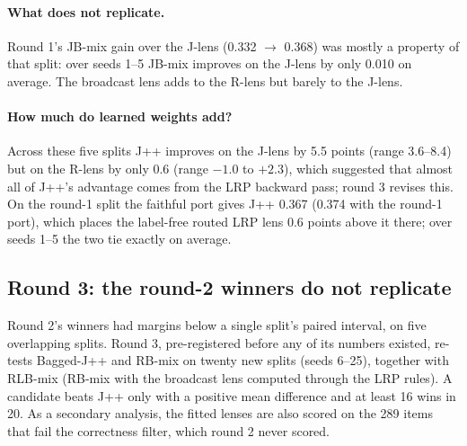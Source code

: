\documentclass[11pt]{article}
\theoremstyle{definition}
\begin{document}
\paragraph{What does not replicate.} Round 1's JB-mix gain over the J-lens (0.332 $\to$ 0.368) was
mostly a property of that split: over seeds 1--5 JB-mix improves on the J-lens by only 0.010 on average.
The broadcast lens adds to the R-lens but barely to the J-lens.

\paragraph{How much do learned weights add?} Across these five splits J++ improves on the J-lens by
5.5 points (range 3.6--8.4) but on the R-lens by only 0.6 (range $-1.0$ to $+2.3$), which suggested
that almost all of J++'s advantage comes from the LRP backward pass; round 3 revises this. On the round-1
split the faithful port gives J++ 0.367 (0.374 with the round-1 port), which places the label-free
routed LRP lens 0.6 points above it there; over seeds 1--5 the two tie exactly on average.

\subsection{Round 3: the round-2 winners do not replicate}
\label{sec:round3}

Round 2's winners had margins below a single split's paired interval, on five overlapping splits.
Round 3, pre-registered before any of its numbers existed, re-tests Bagged-J++ and RB-mix on twenty
new splits (seeds 6--25), together with RLB-mix (RB-mix with the broadcast lens computed through the
LRP rules). A candidate beats J++ only with a positive mean difference and at least 16 wins in 20. As a
secondary analysis, the fitted lenses are also scored on the 289 items that fail the correctness filter,
which round 2 never scored.
\end{document}
